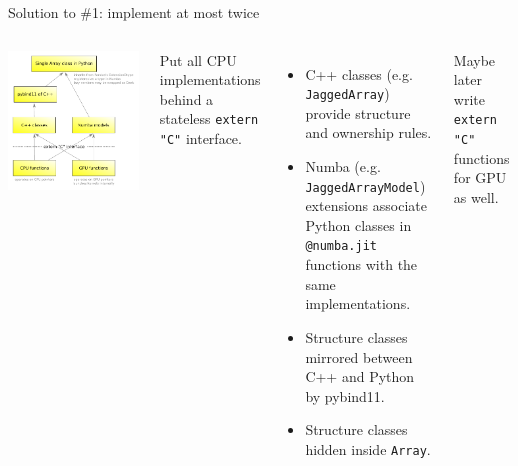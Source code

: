 \documentclass[aspectratio=169]{beamer}
\begin{document}
\begin{frame}{Solution to \#1: implement at most twice}
\vspace{0.1 cm}

\begin{columns}
\includegraphics[width=\linewidth]{awkward-1-0-layers.pdf}

Put all CPU implementations behind a stateless \texttt{extern "C"} interface.

\begin{itemize}
\item C++ classes (e.g. {\tt JaggedArray}) provide structure and ownership rules.
\item Numba (e.g. {\tt JaggedArrayModel}) extensions associate Python classes in \texttt{@numba.jit} functions with the same implementations.
\item Structure classes mirrored between C++ and Python by pybind11.
\item Structure classes hidden inside {\tt Array}.
\end{itemize}

Maybe later write \texttt{extern "C"} functions for GPU as well.
\end{columns}
\end{frame}
\end{document}
